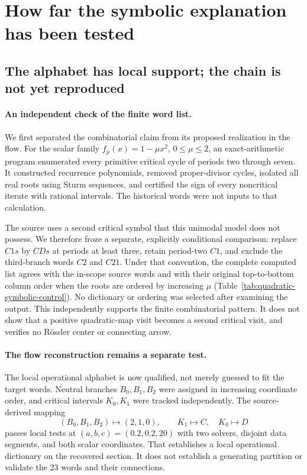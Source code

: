 \section{How far the symbolic explanation has been tested}
\label{sec:results}

\subsection{The alphabet has local support; the chain is not yet reproduced}
\label{sec:symbolic-results}

\paragraph{An independent check of the finite word list.}
We first separated the combinatorial claim from its proposed realization
in the flow. For the scalar family $f_\mu(x)=1-\mu x^2$, $0\leq\mu\leq2$,
an exact-arithmetic program enumerated every primitive critical cycle of
periods two through seven. It constructed recurrence polynomials, removed
proper-divisor cycles, isolated all real roots using Sturm sequences, and
certified the sign of every noncritical iterate with rational intervals.
The historical words were not inputs to that calculation.

The source uses a second critical symbol that this unimodal model does not
possess. We therefore froze a separate, explicitly conditional comparison:
replace $C1s$ by $CDs$ at periods at least three, retain period-two $C1$,
and exclude the third-branch words $C2$ and $C21$. Under that convention,
the complete computed list agrees with the in-scope source words and with
their original top-to-bottom column order when the roots are ordered by
increasing $\mu$ (Table~\ref{tab:quadratic-symbolic-control}). No dictionary
or ordering was selected after examining the output. This independently
supports the finite combinatorial pattern. It does not show that a positive
quadratic-map visit becomes a second critical visit, and verifies no
R{\"o}ssler center or connecting arrow.


\paragraph{The flow reconstruction remains a separate test.}
The local operational alphabet is now qualified, not merely guessed to
fit the target words. Neutral branches $B_0,B_1,B_2$ were assigned in
increasing coordinate order, and critical intervals $K_0,K_1$ were
tracked independently. The source-derived mapping
\[
 (B_0,B_1,B_2)\mapsto(2,1,0),\qquad K_1\mapsto C,\quad K_0\mapsto D
\]
passes local tests at $(a,b,c)=(0.2,0.2,20)$ with two solvers, disjoint
data segments, and both scalar coordinates. That establishes a local operational dictionary on the
recovered section. It does not establish a generating partition or
validate the 23 words and their connections.

